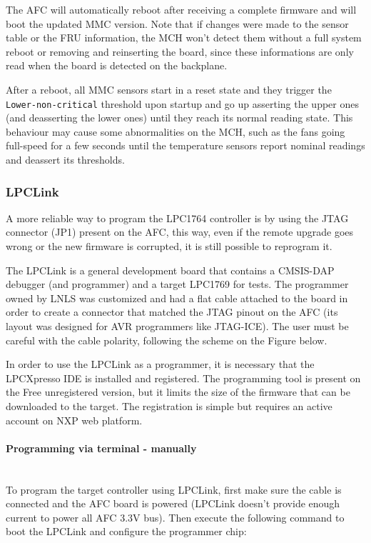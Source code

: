 \documentclass[letterpaper,12pt, titlepage]{article}
\newcommand{\newparagraph}[1]{\paragraph{#1}\mbox{}\\}
\begin{document}
The AFC will automatically reboot after receiving a complete firmware and will boot the updated MMC version. Note that if changes were made to the sensor table or the FRU information, the MCH won't detect them without a full system reboot or removing and reinserting the board, since these informations are only read when the board is detected on the backplane.

After a reboot, all MMC sensors start in a reset state and they trigger the \texttt{Lower-non-critical} threshold upon startup and go up asserting the upper ones (and deasserting the lower ones) until they reach its normal reading state.
This behaviour may cause some abnormalities on the MCH, such as the fans going full-speed for a few seconds until the temperature sensors report nominal readings and deassert its thresholds.


\subsubsection{LPCLink}
A more reliable way to program the LPC1764 controller is by using the JTAG connector (JP1) present on the AFC, this way, even if the remote upgrade goes wrong or the new firmware is corrupted, it is still possible to reprogram it.

The LPCLink is a general development board that contains a CMSIS-DAP debugger (and programmer) and a target LPC1769 for tests. The programmer owned by LNLS was customized and had a flat cable attached to the board in order to create a connector that matched the JTAG pinout on the AFC (its layout was designed for AVR programmers like JTAG-ICE).
The user must be careful with the cable polarity, following the scheme on the Figure below.


In order to use the LPCLink as a programmer, it is necessary that the LPCXpresso IDE is installed and registered. The programming tool is present on the Free unregistered version, but it limits the size of the firmware that can be downloaded to the target. The registration is simple but requires an active account on NXP web platform.

\newparagraph{Programming via terminal - manually}
To program the target controller using LPCLink, first make sure the cable is connected and the AFC board is powered (LPCLink doesn't provide enough current to power all AFC 3.3V bus). Then execute the following command to boot the LPCLink and configure the programmer chip:
\end{document}
